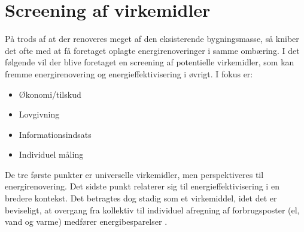 \chapter{Screening af virkemidler}

På trods af at der renoveres meget af den eksisterende bygningsmasse, så kniber det ofte med at få foretaget oplagte energirenoveringer i samme ombæring. I det følgende vil der blive foretaget en screening af potentielle virkemidler, som kan fremme energirenovering og energieffektivisering i øvrigt. I fokus er:

\begin{itemize}
\item Økonomi/tilskud
\item Lovgivning
\item Informationsindsats
\item Individuel måling
\end{itemize}

De tre første punkter er universelle virkemidler, men perspektiveres til energirenovering. Det sidste punkt relaterer sig til energieffektivisering i en bredere kontekst. Det betragtes dog stadig som et virkemiddel, idet det er beviseligt, at overgang fra kollektiv til individuel afregning af forbrugsposter (el, vand og varme) medfører energibesparelser \citep{maalere}.